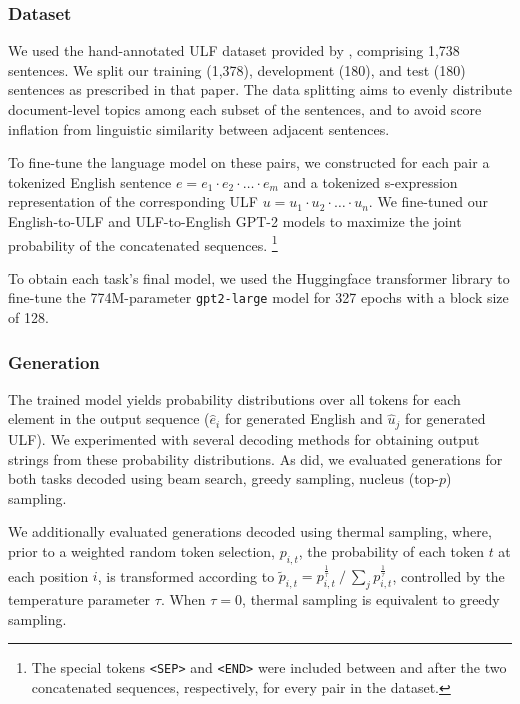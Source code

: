 \subsubsection{Dataset}

We used the hand-annotated ULF dataset provided by \citet{kim2021transition}, comprising 1,738 sentences. We split our training (1,378), development (180), and test (180) sentences as prescribed in that paper. The data splitting aims to evenly distribute document-level topics among each subset of the sentences, and to avoid score inflation from linguistic similarity between adjacent sentences.

To fine-tune the language model on these pairs, we constructed for each pair a tokenized English sentence $e = e_{1} \cdot e_{2} \cdot \ldots \cdot e_{m}$ and a tokenized s-expression representation of the corresponding ULF $u = u_{1} \cdot u_{2} \cdot \ldots \cdot u_{n}$. We fine-tuned our English-to-ULF and ULF-to-English GPT-2 models to maximize the joint probability of the concatenated sequences. \footnote{The special tokens \texttt{<SEP>} and \texttt{<END>} were included between and after the two concatenated sequences, respectively, for every pair in the dataset.}

To obtain each task's final model, we used the Huggingface transformer library to fine-tune the 774M-parameter \texttt{gpt2-large} model for 327 epochs with a block size of 128.

\subsubsection{Generation}

The trained model yields probability distributions over all tokens for each element in the output sequence ($\hat{e}_{i}$ for generated English and $\hat{u}_{j}$ for generated ULF). We experimented with several decoding methods for obtaining output strings from these probability distributions. As \citet{gpt-too} did, we evaluated generations for both tasks decoded using beam search, greedy sampling, nucleus (top-$p$) sampling.

We additionally evaluated generations decoded using thermal sampling, where, prior to a weighted random token selection, $p_{i,t}$, the probability of each token $t$ at each position $i$, is transformed according to $\tilde{p}_{i,t} = p_{i,t}^{\frac{1}{\tau}}\ /\ \sum_{j} p_{i, t}^{\frac{1}{\tau}}$, controlled by the temperature parameter $\tau$. When $\tau = 0$, thermal sampling is equivalent to greedy sampling.

